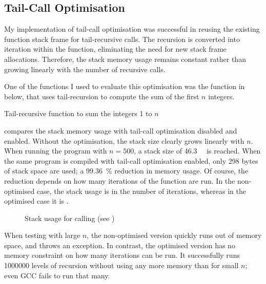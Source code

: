\documentclass[00-main.tex]{subfiles}
\begin{document}
\subsection{Tail-Call Optimisation}

My implementation of tail-call optimisation was successful in reusing the existing function stack frame for tail-recursive calls. The recursion is converted into iteration within the function, eliminating the need for new stack frame allocations.
Therefore, the stack memory usage remains constant rather than growing linearly with the number of recursive calls.

One of the functions I used to evaluate this optimisation was the function in  below, that uses tail-recursion to compute the sum of the first $n$ integers.

\begin{listing}[ht]
  \caption{Tail-recursive function to sum the integers 1 to $n$}
  \label{lst:tail-recursive sum}
\end{listing}


 compares the stack memory usage with tail-call optimisation disabled and enabled.
Without the optimisation, the stack size clearly grows linearly with $n$.
When running the program with $n=500$, a stack size of \SI{46.3}{\kilo\byte} is reached.
When the same program is compiled with tail-call optimisation enabled, only 298 bytes of stack space are used; a \SI{99.36}{\percent} reduction in memory usage.
Of course, the reduction depends on how many iterations of the function are run.
In the non-optimised case, the stack usage is  in the number of iterations, whereas in the optimised case it is .

\begin{figure}[ht]
  \centering
  \caption{Stack usage for calling  (see )}
  \label{fig:tail-call optimisation stack use} %
\end{figure}

When testing with large $n$, the non-optimised version quickly runs out of memory space, and throws an exception.
In contrast, the optimised version has no memory constraint on how many iterations can be run.
It successfully runs \num{1000000} levels of recursion without using any more memory than for small $n$; even GCC fails to run that many.
\end{document}
